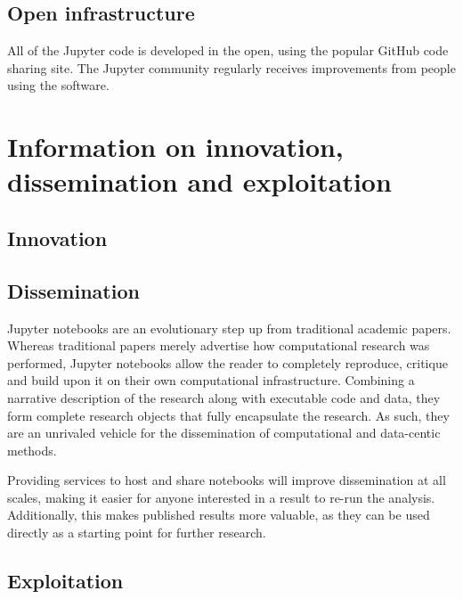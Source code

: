 \subsection{Open infrastructure}

All of the Jupyter code is developed in the open, using the popular GitHub
code sharing site. The Jupyter community regularly receives improvements from
people using the software.


\section{Information on innovation, dissemination and exploitation}

\subsection{Innovation}

\subsection{Dissemination}

Jupyter notebooks are an evolutionary step up from traditional academic papers.
Whereas traditional papers merely advertise how computational research was performed, Jupyter notebooks allow the reader to completely reproduce, critique and build upon it on their own computational infrastructure.
Combining a narrative description of the research along with executable code and data, they form complete research objects that fully encapsulate the research. As such, they are an unrivaled vehicle for the dissemination of computational and data-centic methods.

Providing services to host and share notebooks will improve dissemination at all scales, making it
easier for anyone interested in a result to re-run the analysis. Additionally, this makes
published results more valuable, as they can be used directly as a starting point for further research.

\subsection{Exploitation}
